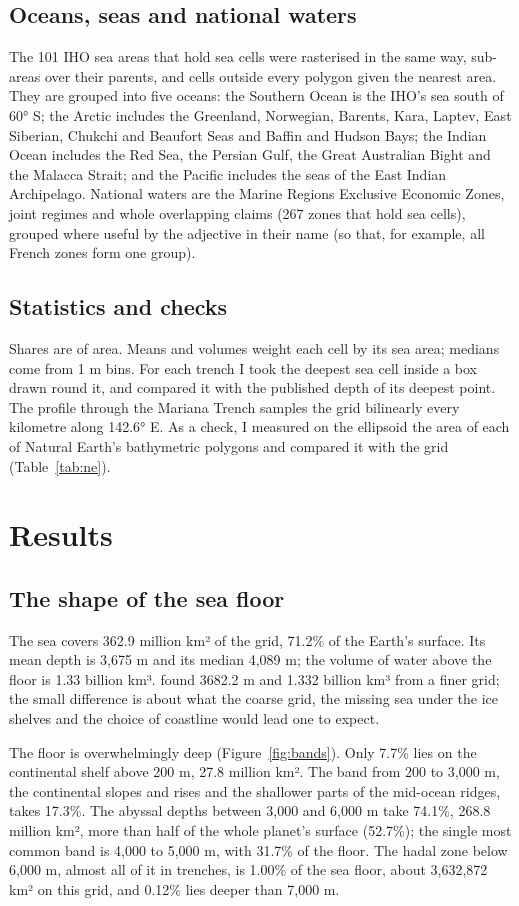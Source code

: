 \documentclass[11pt,a4paper]{article}
\begin{document}
\subsection{Oceans, seas and national waters}
The 101 IHO sea areas that hold sea cells were rasterised in the same way, sub-areas over their parents, and cells outside every polygon given the nearest area. They are grouped into five oceans: the Southern Ocean is the IHO's sea south of 60° S; the Arctic includes the Greenland, Norwegian, Barents, Kara, Laptev, East Siberian, Chukchi and Beaufort Seas and Baffin and Hudson Bays; the Indian Ocean includes the Red Sea, the Persian Gulf, the Great Australian Bight and the Malacca Strait; and the Pacific includes the seas of the East Indian Archipelago. National waters are the Marine Regions Exclusive Economic Zones, joint regimes and whole overlapping claims (267 zones that hold sea cells), grouped where useful by the adjective in their name (so that, for example, all French zones form one group).

\subsection{Statistics and checks}
Shares are of area. Means and volumes weight each cell by its sea area; medians come from 1 m bins. For each trench I took the deepest sea cell inside a box drawn round it, and compared it with the published depth of its deepest point. The profile through the Mariana Trench samples the grid bilinearly every kilometre along 142.6° E. As a check, I measured on the ellipsoid the area of each of Natural Earth's bathymetric polygons and compared it with the grid (Table~\ref{tab:ne}).

\section{Results}
\subsection{The shape of the sea floor}
The sea covers 362.9 million km² of the grid, 71.2\% of the Earth's surface. Its mean depth is 3,675 m and its median 4,089 m; the volume of water above the floor is 1.33 billion km³. \citet{charette} found 3682.2 m and 1.332 billion km³ from a finer grid; the small difference is about what the coarse grid, the missing sea under the ice shelves and the choice of coastline would lead one to expect.

The floor is overwhelmingly deep (Figure~\ref{fig:bands}). Only 7.7\% lies on the continental shelf above 200 m, 27.8 million km². The band from 200 to 3,000 m, the continental slopes and rises and the shallower parts of the mid-ocean ridges, takes 17.3\%. The abyssal depths between 3,000 and 6,000 m take 74.1\%, 268.8 million km², more than half of the whole planet's surface (52.7\%); the single most common band is 4,000 to 5,000 m, with 31.7\% of the floor. The hadal zone below 6,000 m, almost all of it in trenches, is 1.00\% of the sea floor, about 3,632,872 km² on this grid, and 0.12\% lies deeper than 7,000 m.
\end{document}
